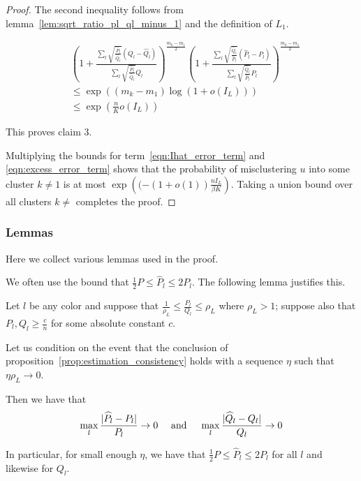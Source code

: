 \begin{proof}
The second inequality follows from lemma~\ref{lem:sqrt_ratio_pl_ql_minus_1} and the definition of $L_1$. 

\begin{align*}
& \left( 1 + 
   \frac{\sum_l \sqrt{\frac{\hat{P}_l}{\hat{Q}_l}} (Q_l - \hat{Q}_l)}
        {\sum_l \sqrt{\frac{\hat{P}_l}{\hat{Q}_l}} \hat{Q}_l} 
     \right)^{\frac{m_k - m_1}{2}} 
   \left( 1+ \frac{\sum_l \sqrt{\frac{\hat{Q}_l}{\hat{P}_l}} (\hat{P}_l - P_l)}
         {\sum_l \sqrt{\frac{\hat{Q}_l}{\hat{P}_l}} P_l } \right)^{\frac{m_k - m_1}{2}} 
\\
&\leq \exp\left( (m_k - m_1) \log(1 + o(I_L) ) \right) \\
&\leq \exp \left( \frac{n}{K} o(I_L) \right) 
\end{align*}

This proves claim 3. 

Multiplying the bounds for term~\ref{eqn:Ihat_error_term} and \ref{eqn:excess_error_term} shows that the probability of misclustering $u$ into some cluster $k \neq 1$ is at most $\exp\left(( - (1 + o(1)) \frac{nI_L}{\beta K} \right)$. Taking a union bound over all clusters $k \neq $ completes the proof.


\end{proof}



\subsubsection{Lemmas}


Here we collect various lemmas used in the proof.

We often use the bound that $\frac{1}{2} P \leq \hat{P}_l \leq 2 P_l$. The following lemma justifies this.

\begin{lemma}
\label{lem:bound_ratio_P_Pl}
Let $l$ be any color and suppose that $\frac{1}{\rho_L} \leq \frac{P_l}{Q_l} \leq \rho_L$ where $\rho_L > 1$; suppose also that $P_l, Q_l \geq \frac{c}{n}$ for some absolute constant $c$.

Let us condition on the event that the 
conclusion of proposition~\ref{prop:estimation_consistency} holds with a sequence $\eta$ such that $\eta \rho_L \rightarrow 0$. 

Then we have that
\[
\max_l \frac{|\widehat{P}_l - P_l|}{P_l} \rightarrow 0
\quad \textrm{ and } \quad
\max_l \frac{|\widehat{Q}_l - Q_l|}{Q_l} \rightarrow 0
\]

In particular, for small enough $\eta$, we have that $\frac{1}{2} P \leq \hat{P}_l \leq 2P_l$ for all $l$ and likewise for $Q_l$.

\end{lemma}


